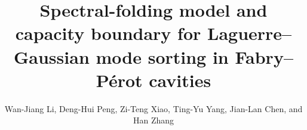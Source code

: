 \documentclass{optica-article}
\begin{document}
\title{Spectral-folding model and capacity boundary for Laguerre--Gaussian mode sorting in Fabry--P\'erot cavities}

\author{Wan-Jiang Li, Deng-Hui Peng, Zi-Teng Xiao, Ting-Yu Yang, Jian-Lan Chen, and Han Zhang}

\address{National Laboratory of Solid State Microstructures, School of Physics, Nanjing University, Nanjing 210093, China\\
School of Physics, Anhui University, Hefei 230039, China\\
Hefei National Laboratory, Hefei 230088, China\\
Jiangsu Key Laboratory of Quantum Information Science and Technology, Nanjing University, China}


\end{document}

